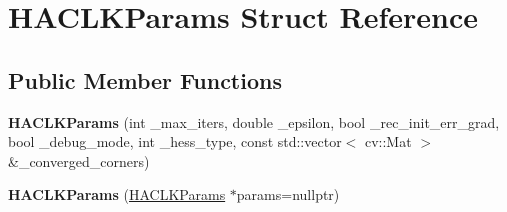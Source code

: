 \hypertarget{structHACLKParams}{\section{H\-A\-C\-L\-K\-Params Struct Reference}
\label{structHACLKParams}
}
\subsection*{Public Member Functions}
\begin{DoxyCompactItemize}
\item 
\hypertarget{structHACLKParams_acbfc280437f95b4efe7627bedcbc2362}{{\bfseries H\-A\-C\-L\-K\-Params} (int \-\_\-max\-\_\-iters, double \-\_\-epsilon, bool \-\_\-rec\-\_\-init\-\_\-err\-\_\-grad, bool \-\_\-debug\-\_\-mode, int \-\_\-hess\-\_\-type, const std\-::vector$<$ cv\-::\-Mat $>$ \&\-\_\-converged\-\_\-corners)}\label{structHACLKParams_acbfc280437f95b4efe7627bedcbc2362}

\item 
\hypertarget{structHACLKParams_afad3712126fc62b7a3e035f514194538}{{\bfseries H\-A\-C\-L\-K\-Params} (\hyperlink{structHACLKParams}{H\-A\-C\-L\-K\-Params} $\ast$params=nullptr)}\label{structHACLKParams_afad3712126fc62b7a3e035f514194538}

\end{DoxyCompactItemize}
